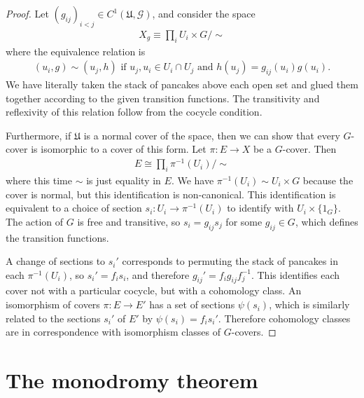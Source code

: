 \documentclass[11pt]{article}
\theoremstyle{definition}
\begin{document}
\begin{proof}
Let $(g_{ij})_{i < j} \in
C^1(\mathfrak U, \mathcal G)$, and consider the space
\begin{align}
X_g \equiv \prod_{i} U_i \times G / \sim
\end{align}
where the equivalence relation is
\begin{align}
(u_i, g) \sim (u_j, h) \text{ if } u_j, u_i \in U_i\cap U_j \text{ and $h(u_j) = g_{ij}(u_i)g(u_i)$}.
\end{align}
We have literally taken the stack of pancakes above each open set and glued them
together according to the given transition functions. The transitivity and
reflexivity of this relation follow from the cocycle condition.

Furthermore, if $\mathfrak U$ is a normal cover of the space, then we can show that every
$G$-cover is isomorphic to a cover of this form. Let $\pi : E \to X$ be a
$G$-cover. Then
\begin{align}
E \cong \prod_{i}\pi^{-1}(U_i) / \sim
\end{align}
where this time $\sim$ is just equality in $E$. We have $\pi^{-1}(U_i) \sim U_i \times G$ because the cover is
normal, but this identification is non-canonical.
This identification is equivalent to a choice of section $s_i : U_i \to
\pi^{-1}(U_i)$ to identify with $U_i \times \{1_G\}$. The action of $G$ is free
and transitive, so $s_i = g_{ij}s_j$ for some $g_{ij} \in G$, which defines the
transition functions.

 A change of sections to $s_i'$ corresponds to permuting the stack of pancakes
 in each $\pi^{-1}(U_i)$, so $s_i' = f_i s_i$, and therefore $g_{ij}' = f_i
 g_{ij}f_{j}^{-1}$. This identifies each cover not with a particular cocycle,
 but with a cohomology class. An isomorphism of covers $\pi : E \to E'$ has a
 set of sections $\psi(s_i)$, which is similarly related to the sections $s_i'$
 of $E'$ by $\psi(s_i) = f_i s_i'$. Therefore cohomology classes are in
 correspondence with isomorphism classes of $G$-covers.
\end{proof}

\section{The monodromy theorem}
\end{document}
